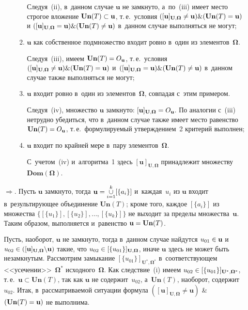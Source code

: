 \begin{multicols}{2}
\begin{enumerate}[(i)]
\begin{enumerate}[(1)]
Следуя~(ii), в~данном случае $\mathbf{u}$ не замк\-ну\-то, а~по~(iii) 
имеет место строгое вложение $\mathbf{Un}(T) \hm\subset \mathbf{u}$, 
т.\,е.\ условия $([\mathbf{u}]_{\mathbf{U},{\boldsymbol{\Omega}}} \not= 
\mathbf{u}) \& 
(\mathbf{Un}(T) \hm= \mathbf{u})$ и
$([\mathbf{u}]_{\mathbf{U},{\boldsymbol{\Omega}}}\hm = 
\mathbf{u}) \& (\mathbf{Un}(T) 
\not= \mathbf{u})$ в~данном случае выполняться не могут;
    \item  $\mathbf{u}$ как собственное подмножество входит ровно 
в~один из элементов~${\boldsymbol{\Omega}}$.
    
Следуя~(iii), имеем $\mathbf{Un}(T)\hm= O_{\mathbf{u}}$, т.\,е.\ условия 
$([\mathbf{u}]_{\mathbf{U},{\boldsymbol{\Omega}}} \not= 
\mathbf{u}) \& 
(\mathbf{Un}(T)\hm = \mathbf{u})$ 
и~$([\mathbf{u}]_{\mathbf{U},{\boldsymbol{\Omega}}}\hm = 
\mathbf{u}) \& 
(\mathbf{Un}(T)\not= \mathbf{u})$ в~данном случае также выполняться не 
могут;
    \item  $\mathbf{u}$ входит ровно в~один из элементов~${\boldsymbol{\Omega}}$, 
совпадая с~этим примером.
    
Следуя~(iv), множество $\mathbf{u}$ замкнуто: 
$[\mathbf{u}]_{\mathbf{U},{\boldsymbol{\Omega}}} \hm= O_{\mathbf{u}}$. По аналогии с~(iii) 
нетрудно убедиться, что в~данном случае также имеет место равенство 
$\mathbf{Un}(T)\hm= O_{\mathbf{u}}$, т.\,е.\ формулируемый утверждением~2 критерий 
выполнен; 
    \item  $\mathbf{u}$ входит по крайней мере в~пару 
элементов~${\boldsymbol{\Omega}}$.

С~учетом~(iv) и~алгоритма~1 здесь $[\mathbf{u}]_{\mathbf{U},{\boldsymbol{\Omega}}}$ 
принадлежит множеству $\mathbf{Dom}({\boldsymbol{\Omega}})$.
    \end{enumerate}
    \end{enumerate}

\noindent
$\Rightarrow$. Пусть $\mathbf{u}$ замкнуто, тогда 
$\mathbf{u}\hm= 
\mathop{\cup}\limits_{i=1}^k [\{a_i\}]$ и~каж\-дая~$u_i$ из $\mathbf{u}$ входит 
в~результирующее объединение $\mathbf{Un}(T)$; кроме того, каждое 
$[\{a_i\}]$ из множества $\{[\{u_1\}], [\{u_2\}], \ldots, [\{u_k\}]\}$ не выходит за 
пределы множества~$\mathbf{u}$. Таким образом, выполняется 
и~равенство $\mathbf{u}\hm= \mathbf{Un}(T)$. 

    Пусть, наоборот, $\mathbf{u}$ не замкнуто, тогда в~данном случае 
найдутся $u_{01}\hm\in\mathbf{u}$ и~$u_{02}\hm\in 
([\mathbf{u}]_{\mathbf{U},{\boldsymbol{\Omega}}}\backslash 
\mathbf{u})$ такие, что 
$u_{02}\hm\in [\{u_{01}\}]_{\mathbf{U},{\boldsymbol{\Omega}}}$, иначе 
$\mathbf{u}$
здесь не может быть незамкнутым. Рассмотрим замыкание 
$[\{u_{01}\}]_{\mathbf{U}^*,{\boldsymbol{\Omega}}^*}$ в~соответствующем 
<<усечении>>~${\boldsymbol{\Omega}}^*$ исходного~${\boldsymbol{\Omega}}$. Как следствие~(i) имеем 
$u_{02}\hm\in [\{u_{01}\}]_{\mathbf{U}^*,{\boldsymbol{\Omega}}^*}$, т.\,е.\ 
$\mathbf{u}\subset \mathbf{Un}(T)$, так как $\mathbf{u}$ не 
содержит~$u_{02}$, а~$\mathbf{Un}(T)$, наоборот, содержит~$u_{02}$. Итак, 
в~рассматриваемой ситуации формула 
$([\mathbf{u}]_{\mathbf{U},{\boldsymbol{\Omega}}}\not= 
\mathbf{u})$ \& 
$(\mathbf{Un}(T)\hm=\mathbf{u})$ не выполнима.
    

\end{multicols}

